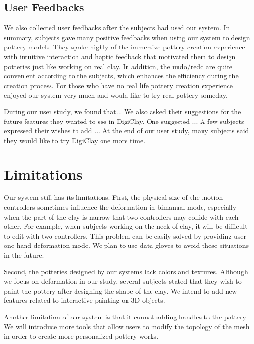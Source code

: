 \subsection{User Feedbacks}
\label{sec:6.5}

We also collected user feedbacks after the subjects had used our system. In summary, subjects gave many positive feedbacks when using our system to design pottery models. They spoke highly of the immersive pottery creation experience with intuitive interaction and haptic feedback that motivated them to design potteries just like working on real clay. In addition, the undo/redo are quite convenient according to the subjects, which enhances the efficiency during the creation process. For those who have no real life pottery creation experience enjoyed our system very much and would like to try real pottery someday. 

During our user study, we found that...
We also asked their suggestions for the future features they wanted to see in DigiClay.
One suggested ...
A few subjects expressed their wishes to add ...
At the end of our user study, many subjects said they would like to try DigiClay one more time.

\section{Limitations}
\label{sec:7}

Our system still has its limitations. First, the physical size of the motion controllers sometimes influence the deformation in bimanual mode, especially when the part of the clay is narrow that two controllers may collide with each other. For example, when subjects working on the neck of clay, it will be difficult to edit with two controllers. This problem can be easily solved by providing user one-hand deformation mode. We plan to use data gloves to avoid these situations in the future.

Second, the potteries designed by our systems lack colors and textures. Although we focus on deformation in our study, several subjects stated that they wish to paint the pottery after designing the shape of the clay. We intend to add new features related to interactive painting on 3D objects.

Another limitation of our system is that it cannot adding handles to the pottery. We will introduce more tools that allow users to modify the topology of the mesh in order to create more personalized pottery works.


